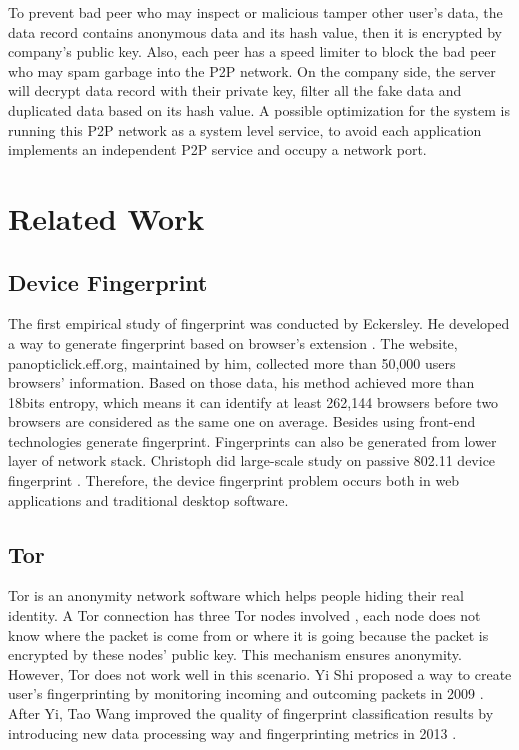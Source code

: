 \documentclass[twocolumn]{article}
\begin{document}
To prevent bad peer who may inspect or malicious tamper other user’s data, the data record contains anonymous data and its hash value, then it is encrypted by company’s public key. Also, each peer has a speed limiter to block the bad peer who may spam garbage into the P2P network. On the company side, the server will decrypt data record with their private key, filter all the fake data and duplicated data based on its hash value. A possible optimization for the system is running this P2P network as a system level service, to avoid each application implements an independent P2P service and occupy a network port.

\section{Related Work}
\subsection{Device Fingerprint}
The first empirical study of fingerprint was conducted by Eckersley. He developed a way to generate fingerprint based on browser’s extension \cite{eckersley2010unique}. The website, panopticlick.eff.org, maintained by him, collected more than 50,000 users browsers’ information. Based on those data, his method achieved more than 18bits entropy, which means it can identify at least 262,144 browsers before two browsers are considered as the same one on average. Besides using front-end technologies generate fingerprint. Fingerprints can also be generated from lower layer of network stack. Christoph did large-scale study on passive 802.11 device fingerprint \cite{neumann2012empirical}.  Therefore, the device fingerprint problem occurs both in web applications and traditional desktop software.
\subsection{Tor}
Tor is an anonymity network software which helps people hiding their real identity. A Tor connection has three Tor nodes involved \cite{tororg}, each node does not know where the packet is come from or where it is going because the packet is encrypted by these nodes’ public key. This mechanism ensures anonymity. However, Tor does not work well in this scenario. Yi Shi proposed a way to create user’s fingerprinting by monitoring incoming and outcoming packets in 2009 \cite{shi2009fingerprinting}. After Yi, Tao Wang improved the quality of fingerprint classification results by introducing new data processing way and fingerprinting metrics in 2013 \cite{wang2013improved}.


{\footnotesize 

}
\end{document}
